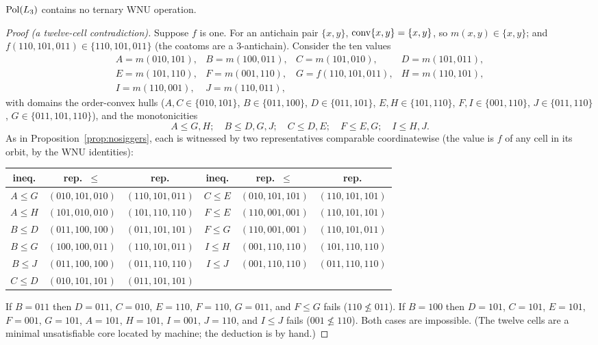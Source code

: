 \begin{prop}\label{prop:base}
  $\operatorname{Pol}(L_3)$ contains no ternary WNU operation.
\end{prop}
\begin{proof}[Proof (a twelve-cell contradiction)]
  Suppose $f$ is one.  For an antichain pair $\{x,y\}$,
  $\operatorname{conv}\{x,y\}=\{x,y\}$, so $m(x,y)\in\{x,y\}$; and $f(110,101,011)\in
  \{110,101,011\}$ (the coatoms are a $3$-antichain).  Consider the ten
  values
  \[\textstyle
  \begin{array}{llll}
  A=m(010,101), & B=m(100,011), & C=m(101,010), & D=m(101,011),\\
  E=m(101,110), & F=m(001,110), & G=f(110,101,011), & H=m(110,101),\\
  I=m(110,001), & J=m(110,011), & &
  \end{array}\]
  with domains the order-convex hulls
  ($A,C\in\{010,101\}$, $B\in\{011,100\}$, $D\in\{011,101\}$,
  $E,H\in\{101,110\}$, $F,I\in\{001,110\}$, $J\in\{011,110\}$,
  $G\in\{011,101,110\}$), and the monotonicities
  \[
    A\le G,H;\quad B\le D,G,J;\quad C\le D,E;\quad F\le E,G;\quad I\le H,J.
  \]
  As in Proposition~\ref{prop:nosiggers}, each is witnessed by two
  representatives comparable coordinatewise (the value is $f$ of any cell
  in its orbit, by the WNU identities):
  \begin{center}\small
  \renewcommand{\arraystretch}{1.05}\setlength{\tabcolsep}{4pt}
  \begin{tabular}{ccc@{\quad}ccc}
  \hline
  ineq. & rep.\ $\le$ & rep. & ineq. & rep.\ $\le$ & rep.\\
  \hline
  $A\le G$ & $(010,101,010)$ & $(110,101,011)$ & $C\le E$ & $(010,101,101)$ & $(110,101,101)$\\
  $A\le H$ & $(101,010,010)$ & $(101,110,110)$ & $F\le E$ & $(110,001,001)$ & $(110,101,101)$\\
  $B\le D$ & $(011,100,100)$ & $(011,101,101)$ & $F\le G$ & $(110,001,001)$ & $(110,101,011)$\\
  $B\le G$ & $(100,100,011)$ & $(110,101,011)$ & $I\le H$ & $(001,110,110)$ & $(101,110,110)$\\
  $B\le J$ & $(011,100,100)$ & $(011,110,110)$ & $I\le J$ & $(001,110,110)$ & $(011,110,110)$\\
  $C\le D$ & $(010,101,101)$ & $(011,101,101)$ & & &\\
  \hline
  \end{tabular}
  \end{center}
  If $B=011$ then $D=011$, $C=010$, $E=110$, $F=110$, $G=011$, and $F\le
  G$ fails ($110\not\le011$).  If $B=100$ then $D=101$, $C=101$,
  $E=101$, $F=001$, $G=101$, $A=101$, $H=101$, $I=001$, $J=110$, and
  $I\le J$ fails ($001\not\le110$).  Both cases are impossible.  (The
  twelve cells are a minimal unsatisfiable core located by machine; the
  deduction is by hand.)
\end{proof}

